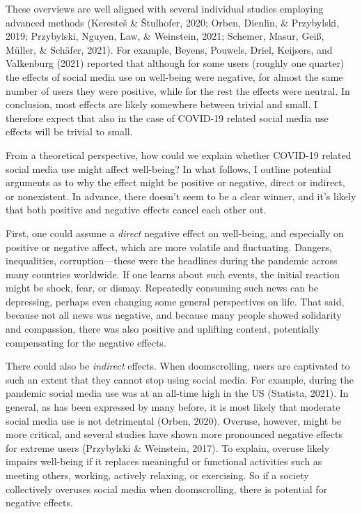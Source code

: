 \documentclass[
  english,
  man,floatsintext]{apa6}
\begin{document}
These overviews are well aligned with several individual studies employing advanced methods (Keresteš \& Štulhofer, 2020; Orben, Dienlin, \& Przybylski, 2019; Przybylski, Nguyen, Law, \& Weinstein, 2021; Schemer, Masur, Geiß, Müller, \& Schäfer, 2021).
For example, Beyens, Pouwels, Driel, Keijsers, and Valkenburg (2021) reported that although for some users (roughly one quarter) the effects of social media use on well-being were negative, for almost the same number of users they were positive, while for the rest the effects were neutral.
In conclusion, most effects are likely somewhere between trivial and small.
I therefore expect that also in the case of COVID-19 related social media use effects will be trivial to small.

From a theoretical perspective, how could we explain whether COVID-19 related social media use might affect well-being?
In what follows, I outline potential arguments as to why the effect might be positive or negative, direct or indirect, or nonexistent.
In advance, there doesn't seem to be a clear winner, and it's likely that both positive and negative effects cancel each other out.

First, one could assume a \emph{direct} negative effect on well-being, and especially on positive or negative affect, which are more volatile and fluctuating.
Dangers, inequalities, corruption---these were the headlines during the pandemic across many countries worldwide.
If one learns about such events, the initial reaction might be shock, fear, or dismay.
Repeatedly consuming such news can be depressing, perhaps even changing some general perspectives on life.
That said, because not all news was negative, and because many people showed solidarity and compassion, there was also positive and uplifting content, potentially compensating for the negative effects.

There could also be \emph{indirect} effects.
When doomscrolling, users are captivated to such an extent that they cannot stop using social media.
For example, during the pandemic social media use was at an all-time high in the US (Statista, 2021).
In general, as has been expressed by many before, it is most likely that moderate social media use is not detrimental (Orben, 2020).
Overuse, however, might be more critical, and several studies have shown more pronounced negative effects for extreme users (Przybylski \& Weinstein, 2017).
To explain, overuse likely impairs well-being if it replaces meaningful or functional activities such as meeting others, working, actively relaxing, or exercising.
So if a society collectively overuses social media when doomscrolling, there is potential for negative effects.
\end{document}

